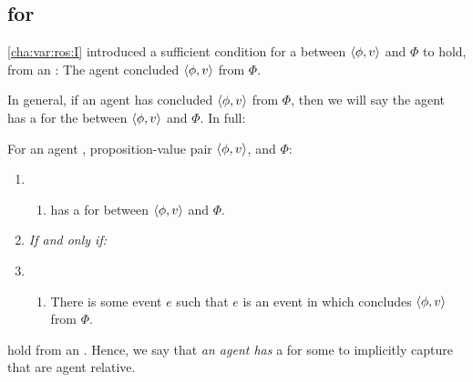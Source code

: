 \subsection{ for }
\label{cha:var:ros:W}

\begin{note}
  \autoref{cha:var:ros:I} introduced a sufficient condition for a \ros{} between \(\langle \phi, v \rangle\) and \(\Phi\) to hold, from an \agpe{}:
  The agent concluded \(\langle \phi, v \rangle\) from \(\Phi\).

  In general, if an agent has concluded \(\langle \phi, v \rangle\) from \(\Phi\), then we will say the agent has a \wit{} for the \ros{} between \(\langle \phi, v \rangle\) and \(\Phi\).
  In full:

  \begin{definition}
    \label{def:witnessing}
    For an agent \vAgent{}, proposition-value pair \(\langle \phi, v \rangle\), and \poP{} \(\Phi\):

    \begin{enumerate}[label=]
    \item
      \begin{enumerate}[label=\alph*., ref=(\alph*), series=WitnessDef]
      \item
        \vAgent{} has a \emph{} for \ros{} between \(\langle \phi, v \rangle\) and \(\Phi\).
      \end{enumerate}
    \item
      \emph{If and only if:}
    \item
      \begin{enumerate}[label=\alph*., ref=(\alph*), resume*=WitnessDef]
      \item
        There is some event \(e\) such that \(e\) is an event in which \vAgent{} concludes \(\langle \phi, v \rangle\) from \(\Phi\).
      \end{enumerate}
    \end{enumerate}
    \vspace{-\baselineskip}
  \end{definition}

   hold from an \agpe{}.
  Hence, we say that \emph{an agent has} a  for some \ros{} to implicitly capture that \ros{} are agent relative.
\end{note}

